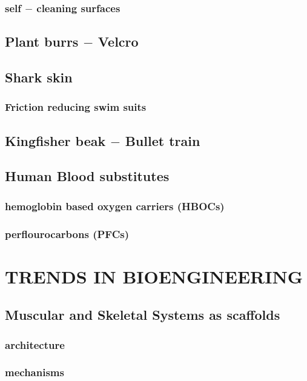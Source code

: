\documentclass{article}
\begin{document}
	\subsubsection{self $-$ cleaning surfaces}

	\subsection{Plant burrs $-$ Velcro}
	
	\subsection{Shark skin}
	\subsubsection{Friction reducing swim suits}
	
	\subsection{Kingfisher beak $-$ Bullet train}

	\subsection{Human Blood substitutes}
	\subsubsection{hemoglobin based oxygen carriers (HBOCs)}
	\subsubsection{perflourocarbons (PFCs)}
	\newpage

	\section{TRENDS IN BIOENGINEERING}
	\subsection{Muscular and Skeletal Systems as scaffolds}
	\subsubsection{architecture}
	\subsubsection{mechanisms}
\end{document}
